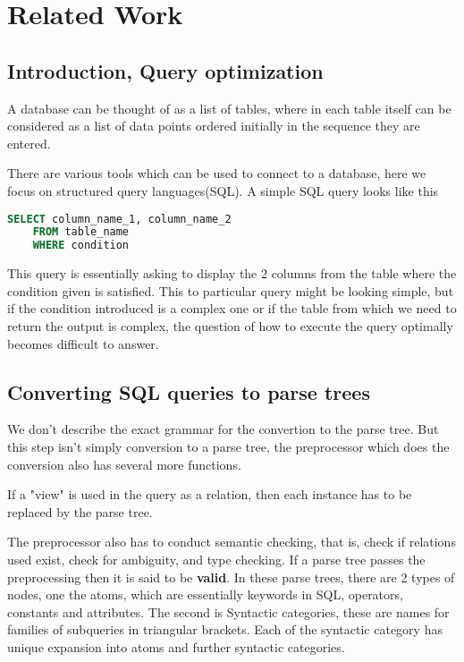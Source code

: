 \chapter{Related Work}
\label{chapter:related_work}
\thispagestyle{myheadings}

\graphicspath{{2_Body/Figures/}}

\section{Introduction, Query optimization}
A database can be thought of as a list of tables, where in each table itself can be considered as a list of data points ordered initially in the sequence they are entered.
\par There are various tools which can be used to connect to a database, here we focus on structured query languages(SQL). A simple SQL query looks like this
\begin{lstlisting}[language=SQL]
    SELECT column_name_1, column_name_2
    FROM table_name
    WHERE condition
\end{lstlisting}
This query is essentially asking to display the 2 columns from the table where the condition given is satisfied. This to particular query might be looking simple, but if the condition introduced is a complex one or if the table from which we need to return the output is complex, the question of how to execute the query optimally becomes difficult to answer.

\section{Converting SQL queries to parse trees}
We don't describe the exact grammar for the convertion to the parse tree. But this step isn't simply conversion to a parse tree, the preprocessor which does the conversion also has several more functions.
\par If a "view" is used in the query as a relation, then each instance has to be replaced by the parse tree.
\par The preprocessor also has to conduct semantic checking, that is, check if relations used exist, check for ambiguity, and type checking. If a parse tree passes the preprocessing then it is said to be \textbf{valid}.  In these parse trees, there are 2 types of nodes, one the atoms, which are essentially keywords in SQL, operators, constants and attributes. The second is Syntactic categories, these are names for families of subqueries in triangular brackets. Each of the syntactic category has unique expansion into atoms and further syntactic categories.



